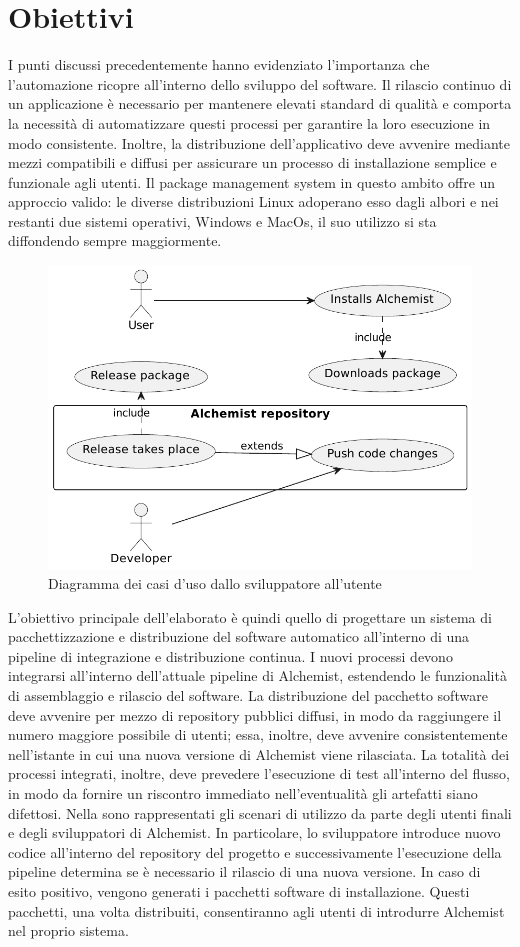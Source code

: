 \section{Obiettivi}
I punti discussi precedentemente hanno evidenziato l'importanza che l'automazione ricopre all'interno dello sviluppo del software. Il rilascio continuo di un applicazione è necessario per mantenere elevati standard di qualità e comporta la necessità di automatizzare questi processi per garantire la loro esecuzione in modo consistente. Inoltre, la distribuzione dell'applicativo deve avvenire mediante mezzi compatibili e diffusi per assicurare un processo di installazione semplice e funzionale agli utenti. Il package management system in questo ambito offre un approccio valido: le diverse distribuzioni Linux adoperano esso dagli albori e nei restanti due sistemi operativi, Windows e MacOs, il suo utilizzo si sta diffondendo sempre maggiormente.
\begin{figure}[htb]
	\centering
	\includegraphics[width=.75\linewidth]{figures/use-case-diagram.pdf}
	\caption{Diagramma dei casi d'uso dallo sviluppatore all'utente}
	\label{fig:use-case-diagram}
\end{figure}

L'obiettivo principale dell'elaborato è quindi quello di progettare un sistema di pacchettizzazione e distribuzione del software automatico all'interno di una pipeline di integrazione e distribuzione continua. I nuovi processi devono integrarsi all'interno dell'attuale pipeline di Alchemist, estendendo le funzionalità di assemblaggio e rilascio del software. La distribuzione del pacchetto software deve avvenire per mezzo di repository pubblici diffusi, in modo da raggiungere il numero maggiore possibile di utenti; essa, inoltre, deve avvenire consistentemente nell'istante in cui una nuova versione di Alchemist viene rilasciata. La totalità dei processi integrati, inoltre, deve prevedere l'esecuzione di test all'interno del flusso, in modo da fornire un riscontro immediato nell'eventualità gli artefatti siano difettosi. Nella  sono rappresentati gli scenari di utilizzo da parte degli utenti finali e degli sviluppatori di Alchemist. In particolare, lo sviluppatore introduce nuovo codice all'interno del repository del progetto e successivamente l'esecuzione della pipeline determina se è necessario il rilascio di una nuova versione. In caso di esito positivo, vengono generati i pacchetti software di installazione. Questi pacchetti, una volta distribuiti, consentiranno agli utenti di introdurre Alchemist nel proprio sistema.